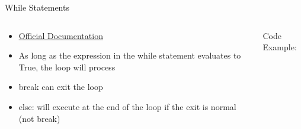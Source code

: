% 
% 
% 
\begin{Slide}{While Statements}
  \begin{columns}
    \begin{column}{.48\textwidth}
      
      \begin{itemize}
      \item \underline{\href{https://docs.python.org/3/reference/compound_stmts.html\#the-while-statement}{Official Documentation}}
      \item As long as the expression in the while statement evaluates to True, the loop will process
      \item break can exit the loop 
      \item else: will execute at the end of the loop if the exit is normal (not break)
      \end{itemize}
      
      
    \end{column}

    \hfill

    \begin{column}{.48\textwidth}
      Code Example:
      

    \inputminted[firstline=3,
      lastline=22,
      breaklines,
      fontsize=\tiny,
      bgcolor=Background,
      linenos]{python}{../src/whileexample.py}

      
      
    \end{column}
  \end{columns}
\end{Slide}


